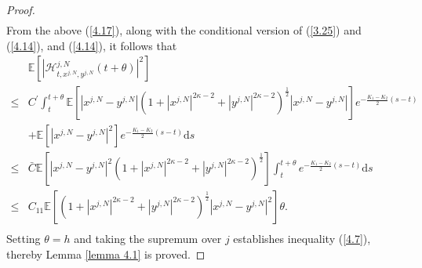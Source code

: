 \documentclass[10pt,a4paper]{amsart}
\begin{document}
\begin{proof}
\begin{equation}
\begin{aligned}
\end{aligned}
\end{equation}
From the above  (\ref{4.17}), along with the conditional version of (\ref{3.25}) and (\ref{4.14}), and (\ref{4.14}), it follows that
\begin{equation}\tag{5.35}\label{4.18}
\begin{aligned}
&\mathbb{E} \left[ \left| \mathcal{H} _{t,x^{j,N},y^{j,N}}^{j,N}\left(t+\theta \right) \right|^2 \right]\\
\le& C^{\prime}\int_t^{t+\theta}{\mathbb{E} \left[ \left|x^{j,N}-y^{j,N}\right|\left( 1+\left|x^{j,N}\right|^{2\kappa -2}+\left|y^{j,N}\right|^{2\kappa -2} \right) ^{\frac{1}{2}}\left|x^{j,N}-y^{j,N}\right| \right] e^{ -\frac{K_1-K_2}{2}\left( s-t \right) }}\\
&+\mathbb{E} \left[ \left|x^{j,N}-y^{j,N}\right|^2 \right] e^{ -\frac{K_1-K_2}{2}\left( s-t \right) }\mathrm{d}s\\
\le& \bar{C}\mathbb{E} \left[ \left|x^{j,N}-y^{j,N}\right|^2\left( 1+\left|x^{j,N}\right|^{2\kappa -2}+\left|y^{j,N}\right|^{2\kappa -2} \right) ^{\frac{1}{2}} \right] \int_t^{t+\theta}{e^{ -\frac{K_1-K_2}{2}\left( s-t \right) }}\mathrm{d}s\\
\le& C_{11}\mathbb{E} \left[ \left( 1+\left| x^{j,N} \right|^{2\kappa -2}+\left| y^{j,N} \right|^{2\kappa -2} \right) ^{\frac{1}{2}}\left| x^{j,N}-y^{j,N} \right|^2 \right] \theta.\\
\end{aligned}
\end{equation}
Setting $\theta=h$ and taking the supremum over $j$  establishes inequality (\ref{4.7}),
thereby Lemma \ref{lemma 4.1} is proved.  
\end{proof} 
\end{document}
